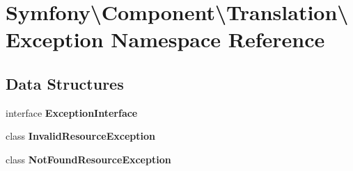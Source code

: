 \section{Symfony\textbackslash{}Component\textbackslash{}Translation\textbackslash{}Exception Namespace Reference}
\label{namespace_symfony_1_1_component_1_1_translation_1_1_exception}
\subsection*{Data Structures}
\begin{DoxyCompactItemize}
\item 
interface {\bf Exception\+Interface}
\item 
class {\bf Invalid\+Resource\+Exception}
\item 
class {\bf Not\+Found\+Resource\+Exception}
\end{DoxyCompactItemize}
